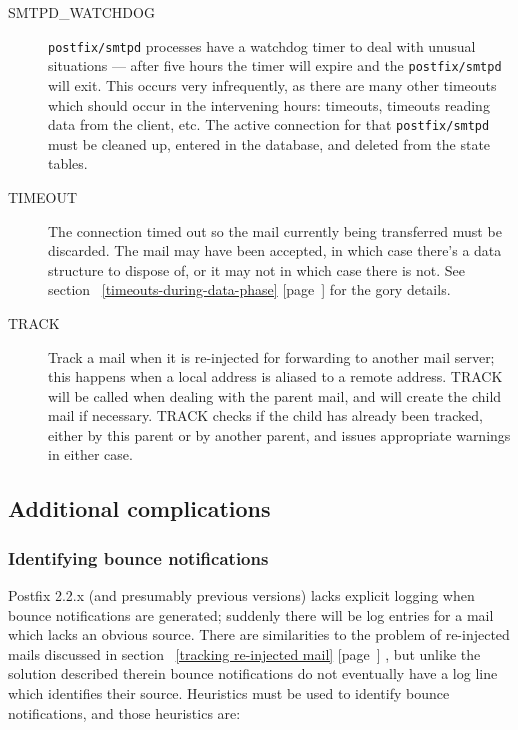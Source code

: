 \documentclass[a4paper,12pt,draft]{article}
\newcommand{\refwithpage}[1]{%
    \empty{}\ref{#1} [page~\pageref{#1}]%
}
\newcommand{\daemon}[1]{%
    \texttt{postfix/#1}%
}
\begin{document}
\begin{description}
    \item [SMTPD\_WATCHDOG] \daemon{smtpd} processes have a watchdog timer
        to deal with unusual situations --- after five hours the timer will
        expire and the \daemon{smtpd} will exit.  This occurs very
        infrequently, as there are many other timeouts which should occur
        in the intervening hours: \DNS{} timeouts, timeouts reading data
        from the client, etc.  The active connection for that
        \daemon{smtpd} must be cleaned up, entered in the database, and
        deleted from the state tables.

    \item [TIMEOUT] The connection timed out so the mail currently being
        transferred must be discarded. The mail may have been accepted, in
        which case there's a data structure to dispose of, or it may not in
        which case there is not.  See
        section~\refwithpage{timeouts-during-data-phase} for the gory
        details.

    \item [TRACK] Track a mail when it is re-injected for forwarding to
        another mail server; this happens when a local address is aliased
        to a remote address.  TRACK will be called when dealing with the
        parent mail, and will create the child mail if necessary. TRACK
        checks if the child has already been tracked, either by this parent
        or by another parent, and issues appropriate warnings in either
        case.

\end{description}

\subsection{Additional complications}

\label{additional complications}

\subsubsection{Identifying bounce notifications}

\label{identifying-bounce-notifications}

Postfix 2.2.x (and presumably previous versions) lacks explicit logging
when bounce notifications are generated; suddenly there will be log entries
for a mail which lacks an obvious source.  There are similarities to the
problem of re-injected mails discussed in section~\refwithpage{tracking
re-injected mail}, but unlike the solution described therein bounce
notifications do not eventually have a log line which identifies their
source.  Heuristics must be used to identify bounce notifications, and
those heuristics are:
\end{document}
